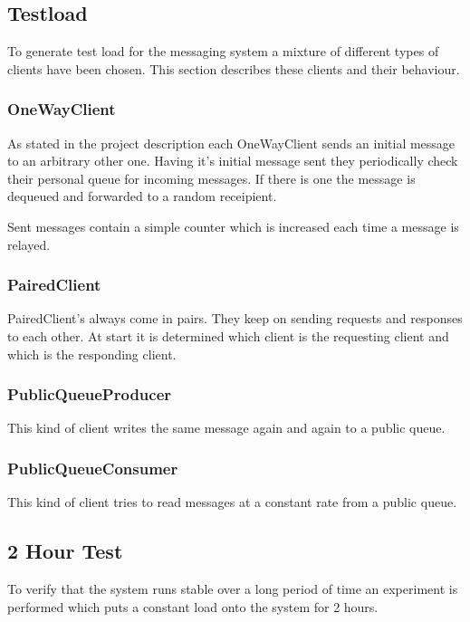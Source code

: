 \documentclass[milestone1.tex]{subfiles}
\begin{document}
\subsection{Testload}
To generate test load for the messaging system a mixture of different types of clients have been chosen. This section describes these clients and their behaviour.

\subsubsection{OneWayClient}
As stated in the project description each OneWayClient sends an initial message to an arbitrary other one. Having it's initial message sent they periodically check their personal queue for incoming messages. If there is one the message is dequeued and forwarded to a random receipient.

Sent messages contain a simple counter which is increased each time a message is relayed.

\subsubsection{PairedClient}
PairedClient's always come in pairs. They keep on sending requests and responses to each other. At start it is determined which client is the requesting client and which is the responding client.

\subsubsection{PublicQueueProducer}
This kind of client writes the same message again and again to a public queue.

\subsubsection{PublicQueueConsumer}
This kind of client tries to read messages at a constant rate from a public queue.

\subsection{2 Hour Test}



To verify that the system runs stable over a long period of time an experiment is performed which puts a constant load onto the system for 2 hours.\\
\end{document}
